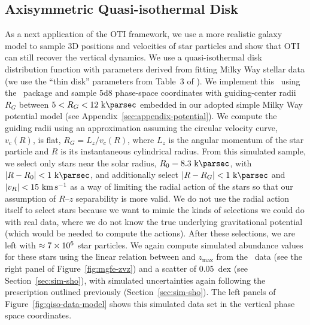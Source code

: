 \documentclass[modern]{aastex631}
\begin{document}
\subsection{Axisymmetric Quasi-isothermal Disk}
\label{sec:sim-qiso}

As a next application of the OTI framework, we use a more realistic galaxy model to
sample 3D positions and velocities of star particles and show that OTI can still recover
the vertical dynamics.
We use a quasi-isothermal disk distribution function \citep[\df;][]{Binney:2012} with
parameters derived from fitting Milky Way stellar data (we use the ``thin disk''
parameters from Table~3 of \citealt{Sanders:2015}).
We implement this \df\ using the \agama\ package \citep{Vasiliev:2019} and sample
\num{5d8} phase-space coordinates with guiding-center radii $R_G$ between $5 < R_G <
12~\kpc$ embedded in our adopted simple Milky Way potential model (see
Appendix~\ref{sec:appendix-potential}).
We compute the guiding radii using an approximation assuming the circular velocity
curve, $v_c(R)$, is flat, $R_G = L_z / v_c(R)$, where $L_z$ is the angular momentum of
the star particle and $R$ is its instantaneous cylindrical radius.
From this simulated sample, we select only stars near the solar radius, $R_0=8.3~\kpc$,
with $|R-R_0| < 1~\kpc$, and additionally select $|R-R_G| < 1~\kpc$ and $|v_R| <
15~\kms$ as a way of limiting the radial action of the stars so that our assumption of
$R$--$z$ separability is more valid.
We do not use the radial action itself to select stars because we want to mimic the
kinds of selections we could do with real data, where we do not know the true underlying
gravitational potential (which would be needed to compute the actions).
After these selections, we are left with $\approx \num{7d6}$ star particles.
We again compute simulated  abundance values for these stars using the
linear relation between  and $z_{\textrm{max}}$ from the \apogee\ data (see
the right panel of Figure~\ref{fig:mgfe-zvz}) and a scatter of 0.05~dex (see
Section~\ref{sec:sim-sho}), with simulated uncertainties again following the
prescription outlined previously (Section~\ref{sec:sim-sho}).
The left panels of Figure~\ref{fig:qiso-data-model} shows this simulated data set in the
vertical phase space coordinates.
\end{document}
